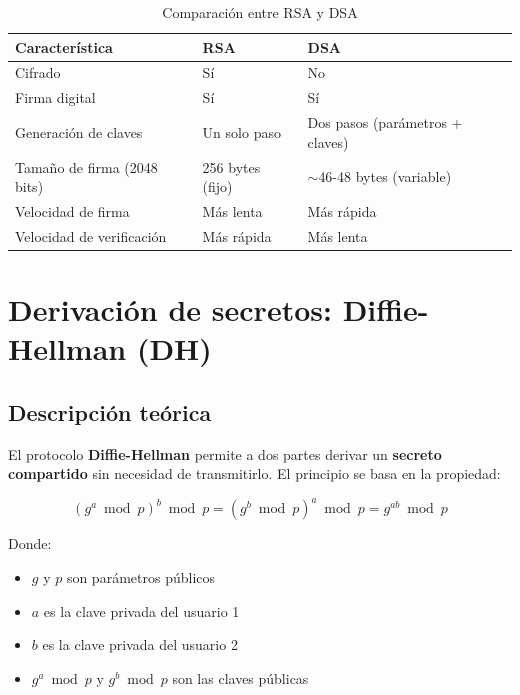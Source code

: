 \begin{table}[H]
    \centering
    \caption{Comparación entre RSA y DSA}
    \begin{tabularx}{\textwidth}{l|p{5cm}|p{5cm}}
        \toprule
        \textbf{Característica} & \textbf{RSA} & \textbf{DSA} \\
        \midrule
        Cifrado & Sí & No \\
        Firma digital & Sí & Sí \\
        Generación de claves & Un solo paso & Dos pasos (parámetros + claves) \\
        Tamaño de firma (2048 bits) & 256 bytes (fijo) & $\sim$46-48 bytes (variable) \\
        Velocidad de firma & Más lenta & Más rápida \\
        Velocidad de verificación & Más rápida & Más lenta \\
        \bottomrule
    \end{tabularx}
\end{table}


\section{Derivación de secretos: Diffie-Hellman (DH)}

\subsection{Descripción teórica}

El protocolo \textbf{Diffie-Hellman} permite a dos partes derivar un \textbf{secreto compartido} sin necesidad de transmitirlo. El principio se basa en la propiedad:

\begin{equation}
(g^a \bmod p)^b \bmod p = (g^b \bmod p)^a \bmod p = g^{ab} \bmod p
\end{equation}

Donde:
\begin{itemize}
    \item $g$ y $p$ son parámetros públicos
    \item $a$ es la clave privada del usuario 1
    \item $b$ es la clave privada del usuario 2
    \item $g^a \bmod p$ y $g^b \bmod p$ son las claves públicas
\end{itemize}

